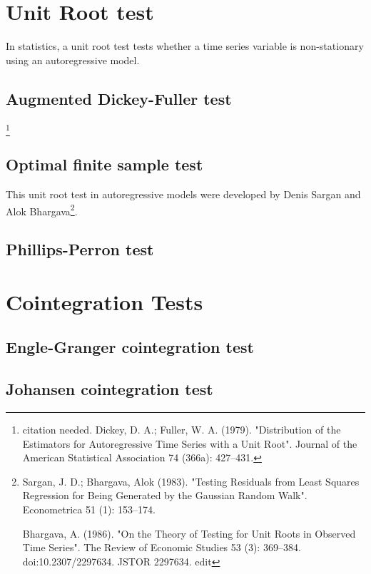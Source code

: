 \section{Unit Root test}

In statistics, a unit root test tests whether a time series variable is non-stationary using an autoregressive model. 

\subsection{Augmented Dickey-Fuller test}

\footnote{citation needed. Dickey, D. A.; Fuller, W. A. (1979). "Distribution of the Estimators for Autoregressive Time Series with a Unit Root". Journal of the American Statistical Association 74 (366a): 427–431.}

\subsection{Optimal finite sample test}

This unit root test in autoregressive models were developed by Denis Sargan and Alok Bhargava\footnote{Sargan, J. D.; Bhargava, Alok (1983). "Testing Residuals from Least Squares Regression for Being Generated by the Gaussian Random Walk". Econometrica 51 (1): 153–174.

Bhargava, A. (1986). "On the Theory of Testing for Unit Roots in Observed Time Series". The Review of Economic Studies 53 (3): 369–384. doi:10.2307/2297634. JSTOR 2297634. edit}. 

\subsection{Phillips-Perron test}



\section{Cointegration Tests}

\subsection{Engle-Granger cointegration test}

\subsection{Johansen cointegration test}

